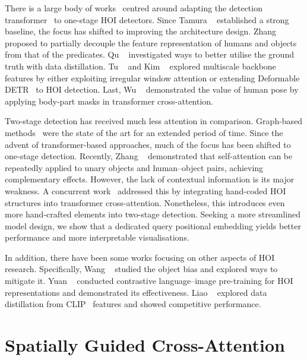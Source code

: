 \documentclass[10pt,twocolumn,letterpaper]{article}
\begin{document}
There is a large body of works~\cite{qpic, hotr, hoitrans, asnet} centred around adapting the detection transformer~\cite{detr} to one-stage HOI detectors. Since Tamura \etal~\cite{qpic} established a strong baseline, the focus has shifted to improving the architecture design. Zhang \etal~\cite{cdn} proposed to partially decouple the feature representation of humans and objects from that of the predicates. 
Qu \etal~\cite{doq} investigated ways to better utilise the ground truth with data distillation. 
Tu \etal~\cite{iwin} and Kim \etal~\cite{mstr} explored multiscale backbone features by either exploiting irregular window attention or extending Deformable DETR~\cite{deform-detr} to HOI detection. Last, Wu \etal~\cite{partmap} demonstrated the value of human pose by applying body-part masks in transformer cross-attention.

Two-stage detection has received much less attention in comparison. Graph-based methods~\cite{scg, drg, vsgnet} were the state of the art for an extended period of time. Since the advent of transformer-based approaches, much of the focus has been shifted to one-stage detection. Recently, Zhang \etal~\cite{upt} demonstrated that self-attention can be repeatedly applied to unary objects and human--object pairs, achieving complementary effects. However, the lack of contextual information is its major weakness. A concurrent work~\cite{stip} addressed this by integrating hand-coded HOI structures into transformer cross-attention. Nonetheless, this introduces even more hand-crafted elements into two-stage detection. Seeking a more streamlined model design, we show that a dedicated query positional embedding yields better performance and more interpretable visualisations.

In addition, there have been some works focusing on other aspects of HOI research. Specifically, Wang \etal~\cite{odm} studied the object bias and explored ways to mitigate it. Yuan \etal~\cite{rlip} conducted contrastive language--image pre-training for HOI representations and demonstrated its effectiveness. Liao \etal~\cite{gen-vlkt} explored data distillation from CLIP~\cite{clip} features and showed competitive performance.

\section{Spatially Guided Cross-Attention}
\end{document}
